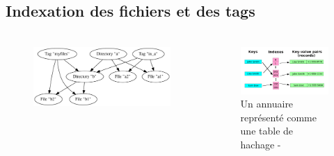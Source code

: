 \documentclass[10pt]{beamer}
\begin{document}
\subsection{Indexation des fichiers et des tags}
\begin{frame}
    \frametitle{\subsecname}
    \begin{columns}[T]
        \begin{column}{.6\textwidth}
            \begin{figure}
                \begin{center}
                    \includegraphics[width=1\textwidth]{images/graph.png}
                \end{center}
            \end{figure}
        \end{column}
        \pause
        \begin{column}{.4\textwidth}
            \begin{figure}
                \begin{center}
                    \includegraphics[width=1\textwidth]{images/hashmap_wiki.png}
                    \caption{Un annuaire représenté comme une table de hachage - \cite{ref27}}
                \end{center}
            \end{figure}
        \end{column}
    \end{columns}
\end{frame}
\end{document}

